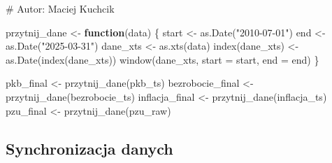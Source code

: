 \documentclass[
  polish,
  letterpaper,
  DIV=11,
  numbers=noendperiod]{scrartcl}
\newenvironment{Shaded}{\begin{snugshade}}{\end{snugshade}}
\newcommand{\AttributeTok}[1]{\textcolor[rgb]{0.40,0.45,0.13}{#1}}
\newcommand{\CommentTok}[1]{\textcolor[rgb]{0.37,0.37,0.37}{#1}}
\newcommand{\ControlFlowTok}[1]{\textcolor[rgb]{0.00,0.23,0.31}{\textbf{#1}}}
\newcommand{\FunctionTok}[1]{\textcolor[rgb]{0.28,0.35,0.67}{#1}}
\newcommand{\NormalTok}[1]{\textcolor[rgb]{0.00,0.23,0.31}{#1}}
\newcommand{\OtherTok}[1]{\textcolor[rgb]{0.00,0.23,0.31}{#1}}
\newcommand{\StringTok}[1]{\textcolor[rgb]{0.13,0.47,0.30}{#1}}
\begin{document}
\begin{Shaded}
\begin{Highlighting}[]
\CommentTok{\# Autor: Maciej Kuchcik}

\NormalTok{przytnij\_dane }\OtherTok{\textless{}{-}} \ControlFlowTok{function}\NormalTok{(data) \{}
\NormalTok{  start }\OtherTok{\textless{}{-}} \FunctionTok{as.Date}\NormalTok{(}\StringTok{"2010{-}07{-}01"}\NormalTok{)}
\NormalTok{  end   }\OtherTok{\textless{}{-}} \FunctionTok{as.Date}\NormalTok{(}\StringTok{"2025{-}03{-}31"}\NormalTok{)}
\NormalTok{  dane\_xts }\OtherTok{\textless{}{-}} \FunctionTok{as.xts}\NormalTok{(data)}
  \FunctionTok{index}\NormalTok{(dane\_xts) }\OtherTok{\textless{}{-}} \FunctionTok{as.Date}\NormalTok{(}\FunctionTok{index}\NormalTok{(dane\_xts))}
  \FunctionTok{window}\NormalTok{(dane\_xts, }\AttributeTok{start =}\NormalTok{ start, }\AttributeTok{end =}\NormalTok{ end)}
\NormalTok{\}}

\NormalTok{pkb\_final        }\OtherTok{\textless{}{-}} \FunctionTok{przytnij\_dane}\NormalTok{(pkb\_ts)}
\NormalTok{bezrobocie\_final }\OtherTok{\textless{}{-}} \FunctionTok{przytnij\_dane}\NormalTok{(bezrobocie\_ts)}
\NormalTok{inflacja\_final   }\OtherTok{\textless{}{-}} \FunctionTok{przytnij\_dane}\NormalTok{(inflacja\_ts)}
\NormalTok{pzu\_final        }\OtherTok{\textless{}{-}} \FunctionTok{przytnij\_dane}\NormalTok{(pzu\_raw)}
\end{Highlighting}
\end{Shaded}

\subsection{Synchronizacja danych}\label{synchronizacja-danych}
\end{document}
